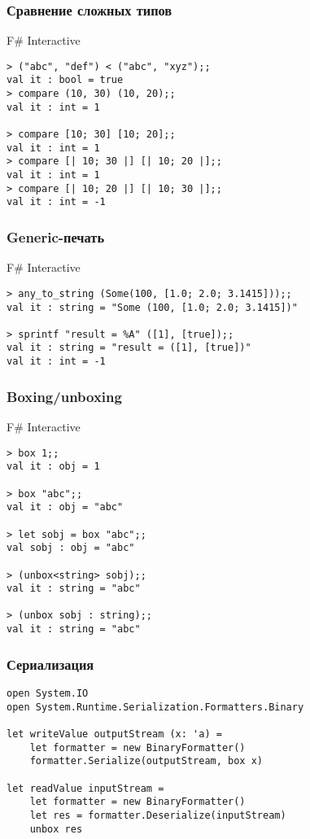 \documentclass[xetex,mathserif,serif]{beamer}
\begin{document}
	\begin{frame}[fragile]
		\frametitle{Сравнение сложных типов}
		\begin{alertblock}{F\# Interactive}
			\begin{verbatim}
> ("abc", "def") < ("abc", "xyz");;
val it : bool = true
> compare (10, 30) (10, 20);;
val it : int = 1

> compare [10; 30] [10; 20];;
val it : int = 1
> compare [| 10; 30 |] [| 10; 20 |];;
val it : int = 1
> compare [| 10; 20 |] [| 10; 30 |];;
val it : int = -1
			\end{verbatim}
		\end{alertblock}
	\end{frame}

	\begin{frame}[fragile]
		\frametitle{Generic-печать}
		\begin{alertblock}{F\# Interactive}
			\begin{verbatim}
> any_to_string (Some(100, [1.0; 2.0; 3.1415]));;
val it : string = "Some (100, [1.0; 2.0; 3.1415])"

> sprintf "result = %A" ([1], [true]);;
val it : string = "result = ([1], [true])"
val it : int = -1
			\end{verbatim}
		\end{alertblock}
	\end{frame}

	\begin{frame}[fragile]
		\frametitle{Boxing/unboxing}
		\begin{alertblock}{F\# Interactive}
			\begin{verbatim}
> box 1;;
val it : obj = 1

> box "abc";;
val it : obj = "abc"

> let sobj = box "abc";;
val sobj : obj = "abc"

> (unbox<string> sobj);;
val it : string = "abc"

> (unbox sobj : string);;
val it : string = "abc"
			\end{verbatim}
		\end{alertblock}
	\end{frame}

	\begin{frame}[fragile]
		\frametitle{Сериализация}
		\begin{verbatim}
open System.IO
open System.Runtime.Serialization.Formatters.Binary

let writeValue outputStream (x: 'a) =
    let formatter = new BinaryFormatter()
    formatter.Serialize(outputStream, box x)

let readValue inputStream =
    let formatter = new BinaryFormatter()
    let res = formatter.Deserialize(inputStream)
    unbox res
		\end{verbatim}
	\end{frame}
\end{document}
